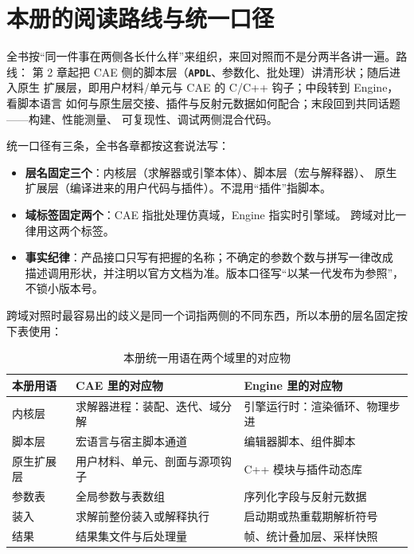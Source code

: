 \documentclass[12pt,a4paper,fontset=fandol]{ctexbook}
\newcommand{\Lib}[1]{\textbf{\texttt{#1}}}
\newcommand{\Lang}[1]{\textsf{#1}}
\newcommand{\CPP}{\Lang{C++}}
\newcommand{\DomCAE}{\Lang{CAE}}
\newcommand{\DomEngine}{\Lang{Engine}}
\begin{document}
\section{本册的阅读路线与统一口径}
\label{sec:ch01-roadmap}

全书按``同一件事在两侧各长什么样''来组织，来回对照而不是分两半各讲一遍。路线：
第 2 章起把 \DomCAE{} 侧的脚本层（\Lib{APDL}、参数化、批处理）讲清形状；随后进入原生
扩展层，即用户材料/单元与 \DomCAE{} 的 C/C++ 钩子；中段转到 \DomEngine{}，看脚本语言
如何与原生层交接、插件与反射元数据如何配合；末段回到共同话题——构建、性能测量、
可复现性、调试两侧混合代码。

统一口径有三条，全书各章都按这套说法写：

\begin{itemize}
\item \textbf{层名固定三个}：内核层（求解器或引擎本体）、脚本层（宏与解释器）、
  原生扩展层（编译进来的用户代码与插件）。不混用``插件''指脚本。
\item \textbf{域标签固定两个}：\DomCAE{} 指批处理仿真域，\DomEngine{} 指实时引擎域。
  跨域对比一律用这两个标签。
\item \textbf{事实纪律}：产品接口只写有把握的名称；不确定的参数个数与拼写一律改成
  描述调用形状，并注明以官方文档为准。版本口径写``以某一代发布为参照''，不锁小版本号。
\end{itemize}

跨域对照时最容易出的歧义是同一个词指两侧的不同东西，所以本册的层名固定按下表使用：

\begin{table}[htbp]
\centering
\caption{本册统一用语在两个域里的对应物}
\label{tab:ch01-terms}
\begin{tabular}{>{\raggedright\arraybackslash}p{}
                >{\raggedright\arraybackslash}p{}
                >{\raggedright\arraybackslash}p{}}
\toprule
\textbf{本册用语} & \textbf{\DomCAE{} 里的对应物} & \textbf{\DomEngine{} 里的对应物} \\
\midrule
内核层 & 求解器进程：装配、迭代、域分解 & 引擎运行时：渲染循环、物理步进 \\
脚本层 & 宏语言与宿主脚本通道 & 编辑器脚本、组件脚本 \\
原生扩展层 & 用户材料、单元、剖面与源项钩子 & \CPP{} 模块与插件动态库 \\
参数表 & 全局参数与表数组 & 序列化字段与反射元数据 \\
装入 & 求解前整份装入或解释执行 & 启动期或热重载期解析符号 \\
结果 & 结果集文件与后处理量 & 帧、统计叠加层、采样快照 \\
\bottomrule
\end{tabular}
\end{table}
\end{document}
